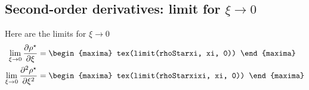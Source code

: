\subsection{Second-order derivatives: limit for $\xi \to 0$}
Here are the limits for $\xi \to 0$
{\color{MonVertF}
\begin{align*}
  \lim_{\xi \to 0} \frac{\partial \rho^\star}{\partial \xi}
  &=
    \begin{maxima}
      tex(limit(rhoStarxi, xi, 0))
    \end{maxima}
  \\
   \lim_{\xi \to 0} \frac{\partial^2 \rho^\star}{\partial \xi^2}
  &=
    \begin{maxima}
      tex(limit(rhoStarxixi, xi, 0))
    \end{maxima}
\end{align*}}
